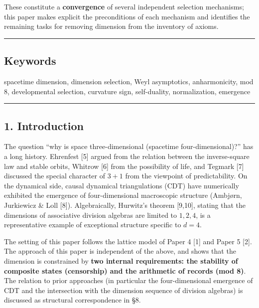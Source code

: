 \documentclass[
]{article}
\begin{document}
These constitute a \textbf{convergence} of several independent selection
mechanisms; this paper makes explicit the preconditions of each
mechanism and identifies the remaining tasks for removing dimension from
the inventory of axioms.

\begin{center}\rule{0.5\linewidth}{0.5pt}\end{center}

\subsection{Keywords}\label{keywords}

spacetime dimension, dimension selection, Weyl asymptotics,
anharmonicity, mod 8, developmental selection, curvature sign,
self-duality, normalization, emergence

\begin{center}\rule{0.5\linewidth}{0.5pt}\end{center}

\subsection{1. Introduction}\label{introduction}

The question ``why is space three-dimensional (spacetime
four-dimensional)?'' has a long history. Ehrenfest {[}5{]} argued from
the relation between the inverse-square law and stable orbits, Whitrow
{[}6{]} from the possibility of life, and Tegmark {[}7{]} discussed the
special character of \(3{+}1\) from the viewpoint of predictability. On
the dynamical side, causal dynamical triangulations (CDT) have
numerically exhibited the emergence of four-dimensional macroscopic
structure (Ambjørn, Jurkiewicz \& Loll {[}8{]}). Algebraically,
Hurwitz's theorem {[}9,10{]}, stating that the dimensions of associative
division algebras are limited to \(1,2,4\), is a representative example
of exceptional structure specific to \(d=4\).

The setting of this paper follows the lattice model of Paper 4 {[}1{]}
and Paper 5 {[}2{]}. The approach of this paper is independent of the
above, and shows that the dimension is constrained by \textbf{two
internal requirements: the stability of composite states (censorship)
and the arithmetic of records (mod 8)}. The relation to prior approaches
(in particular the four-dimensional emergence of CDT and the
intersection with the dimension sequence of division algebras) is
discussed as structural correspondence in §8.
\end{document}
